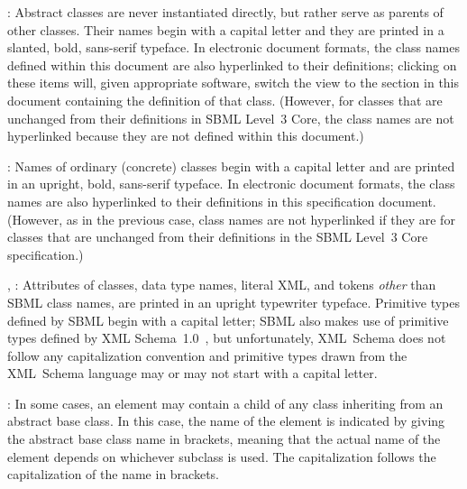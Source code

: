 \documentclass[draftspec]{sbmlpkgspec}
\begin{document}
\begin{description}
  
\item {}: Abstract classes are never
  instantiated directly, but rather serve as parents of other classes.
  Their names begin with a capital letter and they are printed in a
  slanted, bold, sans-serif typeface.  In electronic document formats,
  the class names defined within this document are also hyperlinked to
  their definitions; clicking on these items will, given appropriate
  software, switch the view to the section in this document containing
  the definition of that class.  (However, for classes that are
  unchanged from their definitions in SBML Level~3 Core, the class names
  are not hyperlinked because they are not defined within this
  document.)
  
\item {}: Names of ordinary (concrete) classes begin with a
  capital letter and are printed in an upright, bold, sans-serif
  typeface.  In electronic document formats, the class names are also
  hyperlinked to their definitions in this specification document.
  (However, as in the previous case, class names are not hyperlinked if
  they are for classes that are unchanged from their definitions in the
  SBML Level~3 Core specification.)

\item {}, : Attributes of classes, data
  type names, literal XML, and tokens \emph{other} than SBML class
  names, are printed in an upright typewriter typeface.  Primitive types
  defined by SBML begin with a capital letter; SBML also makes use of
  primitive types defined by XML
  Schema~1.0~\citep{biron:2000,fallside:2000,thompson:2000}, but
  unfortunately, XML~Schema does not follow any capitalization
  convention and primitive types drawn from the XML~Schema language may
  or may not start with a capital letter.

\item \token{[elementName]}:  In some cases, an element may contain a child of any class inheriting from an abstract base class.  In this case, the name of the element is indicated by giving the abstract base class name in brackets, meaning that the actual name of the element depends on whichever subclass is used. The capitalization follows the capitalization of the name in brackets.

\end{description}
\end{document}
